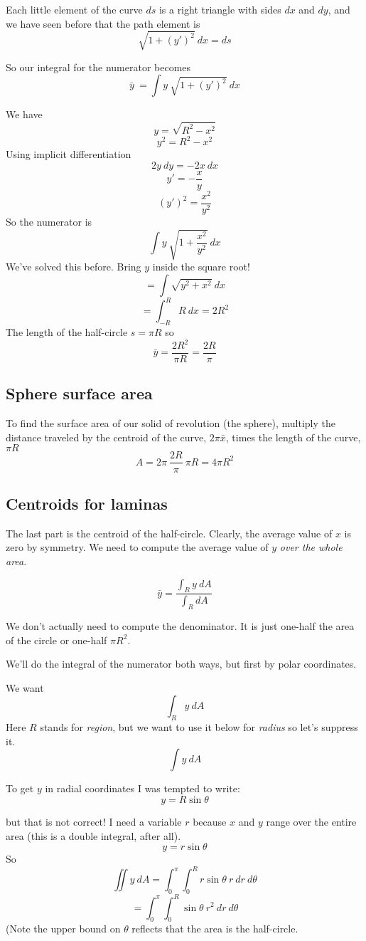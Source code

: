 \documentclass[11pt, oneside]{article}   	%
\begin{document}
Each little element of the curve $ds$ is a right triangle with sides $dx$ and $dy$, and we have seen before that the path element is
\[ \sqrt{1 + (y')^2} \ dx = ds \]

So our integral for the numerator becomes
\[ \bar{y}\ = \int y \ \sqrt{1 + (y')^2} \ dx \]

We have
\[ y = \sqrt{R^2 - x^2} \]
\[ y^2 = R^2 - x^2 \]
Using implicit differentiation
\[ 2y \ dy = - 2x \ dx \]
\[ y' = -\frac{x}{y} \]
\[ (y')^2 = \frac{x^2}{y^2} \]
So the numerator is
\[  \int y \ \sqrt{1 + \frac{x^2}{y^2}} \ dx \]
We've solved this before.  Bring $y$ inside the square root!
\[ = \int \sqrt{y^2 + x^2} \ dx \]
\[  = \int_{-R}^{R} R \ dx = 2R^2 \]
The length of the half-circle $s=\pi R$ so
\[ \bar{y} = \frac{2R^2}{\pi R} = \frac{2R}{\pi} \]

\subsection*{Sphere surface area}

To find the surface area of our solid of revolution (the sphere), multiply the distance traveled by the centroid of the curve, $2 \pi \bar{x} $, times the length of the curve, $\pi R$
\[ A = 2 \pi \ \frac{2 R}{\pi} \ \pi R = 4 \pi R^2 \]

\subsection*{Centroids for laminas}
The last part is the centroid of the half-circle.  Clearly, the average value of $x$ is zero by symmetry.  We need to compute the average value of $y$ \emph{over the whole area}.

\[ \bar{y} = \frac{\int_R y \ dA}{\int_R dA} \]

We don't actually need to compute the denominator.  It is just one-half the area of the circle or one-half $\pi R^2$.  

We'll do the integral of the numerator both ways, but first by polar coordinates.

We want
\[ \int_R y \ dA \]
Here $R$ stands for \emph{region}, but we want to use it below for \emph{radius} so let's suppress it.
\[ \int y \ dA \]

To get $y$ in radial coordinates I was tempted to write:
\[ y = R \sin \theta \]

but that is not correct!  I need a variable $r$ because $x$ and $y$ range over the entire area (this is a double integral, after all).
\[ y = r \sin \theta \]
So
\[ \iint y \ dA = \int_0^{\pi} \int_0^R r \sin \theta \ r \ dr \ d \theta \]
\[ = \int_0^{\pi} \int_0^R \sin \theta \ r^2 \ dr \ d \theta \]
(Note the upper bound on $\theta$ reflects that the area is the half-circle.
\end{document}
